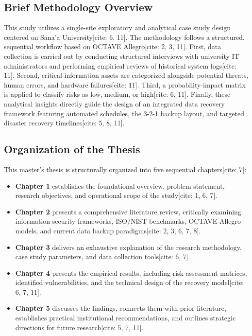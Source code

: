 \documentclass[journal,onecolumn,12pt,twoside]{IEEEtran}
\begin{document}
	\subsection{Brief Methodology Overview}
	\label{subsec:method_overview}
	This study utilizes a single-site exploratory and analytical case study design centered on Sana'a University[cite: 6, 11]. The methodology follows a structured, sequential workflow based on OCTAVE Allegro[cite: 2, 3, 11]. First, data collection is carried out by conducting structured interviews with university IT administrators and performing empirical reviews of historical system logs[cite: 11]. Second, critical information assets are categorized alongside potential threats, human errors, and hardware failures[cite: 11]. Third, a probability-impact matrix is applied to classify risks as low, medium, or high[cite: 6, 11]. Finally, these analytical insights directly guide the design of an integrated data recovery framework featuring automated schedules, the 3-2-1 backup layout, and targeted disaster recovery timelines[cite: 5, 8, 11].
	
	\subsection{Organization of the Thesis}
	\label{subsec:organization}
	This master's thesis is structurally organized into five sequential chapters[cite: 7]:
	\begin{itemize}
		\item \textbf{Chapter 1} establishes the foundational overview, problem statement, research objectives, and operational scope of the study[cite: 1, 6, 7].
		\item \textbf{Chapter 2} presents a comprehensive literature review, critically examining information security frameworks, ISO/NIST benchmarks, OCTAVE Allegro models, and current data backup paradigms[cite: 2, 3, 6, 7, 8].
		\item \textbf{Chapter 3} delivers an exhaustive explanation of the research methodology, case study parameters, and data collection tools[cite: 6, 7].
		\item \textbf{Chapter 4} presents the empirical results, including risk assessment matrices, identified vulnerabilities, and the technical design of the recovery model[cite: 6, 7, 11].
		\item \textbf{Chapter 5} discusses the findings, connects them with prior literature, establishes practical institutional recommendations, and outlines strategic directions for future research[cite: 5, 7, 11].
	\end{itemize}
	
\end{document}
